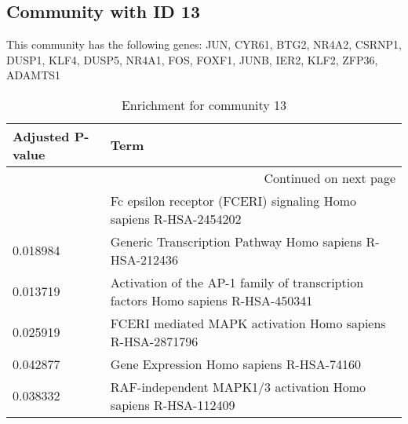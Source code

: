 \subsection*{Community with ID 13}
This community has the following genes: JUN, CYR61, BTG2, NR4A2, CSRNP1, DUSP1, KLF4, DUSP5, NR4A1, FOS, FOXF1, JUNB, IER2, KLF2, ZFP36, ADAMTS1
\\
\begin{longtable}{p{2.4cm}p{14.5cm}}
\caption{Enrichment for community 13}\\
\toprule
Adjusted \newline P-value &                                                                              Term \\
\midrule
\endhead
\midrule
\multicolumn{2}{r}{{Continued on next page}} \\
\midrule
\endfoot

\bottomrule
\endlastfoot
                 0.016362 &                  Fc epsilon receptor (FCERI) signaling Homo sapiens R-HSA-2454202 \\
                 0.018984 &                           Generic Transcription Pathway Homo sapiens R-HSA-212436 \\
                 0.013719 &  Activation of the AP-1 family of transcription factors Homo sapiens R-HSA-450341 \\
                 0.025919 &                         FCERI mediated MAPK activation Homo sapiens R-HSA-2871796 \\
                 0.042877 &                                          Gene Expression Homo sapiens R-HSA-74160 \\
                 0.038332 &                      RAF-independent MAPK1/3 activation Homo sapiens R-HSA-112409 \\
\end{longtable}


